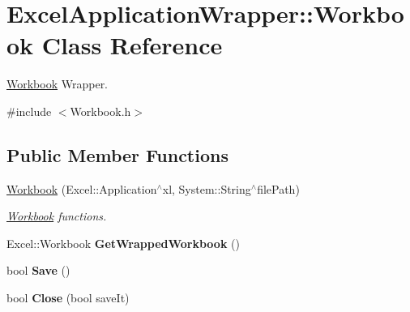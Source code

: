 \hypertarget{class_excel_application_wrapper_1_1_workbook}{}\section{Excel\+Application\+Wrapper\+:\+:Workbook Class Reference}
\label{class_excel_application_wrapper_1_1_workbook}


\hyperlink{class_excel_application_wrapper_1_1_workbook}{Workbook} Wrapper.  




{\ttfamily \#include $<$Workbook.\+h$>$}

\subsection*{Public Member Functions}
\begin{DoxyCompactItemize}
\item 
\hypertarget{class_excel_application_wrapper_1_1_workbook_aa3d0353bffb366c56d41f6d9572ca29e}{}\hyperlink{class_excel_application_wrapper_1_1_workbook_aa3d0353bffb366c56d41f6d9572ca29e}{Workbook} (Excel\+::\+Application$^\wedge$xl, System\+::\+String$^\wedge$file\+Path)\label{class_excel_application_wrapper_1_1_workbook_aa3d0353bffb366c56d41f6d9572ca29e}

\begin{DoxyCompactList}\small\item\em \hyperlink{class_excel_application_wrapper_1_1_workbook}{Workbook} functions. \end{DoxyCompactList}\item 
\hypertarget{class_excel_application_wrapper_1_1_workbook_aa8a663cf5010f40823387cfee8c314b7}{}Excel\+::\+Workbook {\bfseries Get\+Wrapped\+Workbook} ()\label{class_excel_application_wrapper_1_1_workbook_aa8a663cf5010f40823387cfee8c314b7}

\item 
\hypertarget{class_excel_application_wrapper_1_1_workbook_ae9019d1d584fa89b9e9c5dac255fa8d7}{}bool {\bfseries Save} ()\label{class_excel_application_wrapper_1_1_workbook_ae9019d1d584fa89b9e9c5dac255fa8d7}

\item 
\hypertarget{class_excel_application_wrapper_1_1_workbook_ad64d33ea915538ac59f29e8e4f3460cc}{}bool {\bfseries Close} (bool save\+It)\label{class_excel_application_wrapper_1_1_workbook_ad64d33ea915538ac59f29e8e4f3460cc}

\end{DoxyCompactItemize}

